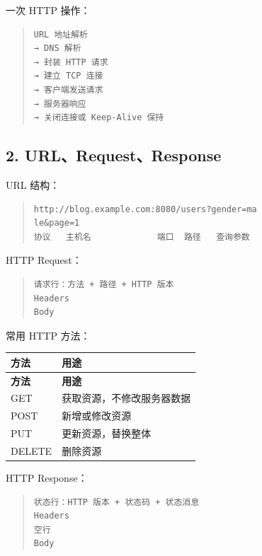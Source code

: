 \documentclass[UTF8,zihao=-4]{ctexart}
\begin{document}
一次 HTTP 操作：

\begin{quote}
\footnotesize
\begin{verbatim}
URL 地址解析
→ DNS 解析
→ 封装 HTTP 请求
→ 建立 TCP 连接
→ 客户端发送请求
→ 服务器响应
→ 关闭连接或 Keep-Alive 保持
\end{verbatim}
\end{quote}

\subsection{2. URL、Request、Response}

URL 结构：

\begin{quote}
\footnotesize
\begin{verbatim}
http://blog.example.com:8080/users?gender=ma
le&page=1
协议   主机名             端口  路径   查询参数
\end{verbatim}
\end{quote}

HTTP Request：

\begin{quote}
\footnotesize
\begin{verbatim}
请求行：方法 + 路径 + HTTP 版本
Headers
Body
\end{verbatim}
\end{quote}

常用 HTTP 方法：

{
\footnotesize
\begin{longtable}{|>{\raggedright\arraybackslash}p{}|>{\raggedright\arraybackslash}p{}|}
\hline
\textbf{方法} & \textbf{用途} \\
\hline
\endfirsthead
\hline
\textbf{方法} & \textbf{用途} \\
\hline
\endhead
GET & 获取资源，不修改服务器数据 \\
\hline
POST & 新增或修改资源 \\
\hline
PUT & 更新资源，替换整体 \\
\hline
DELETE & 删除资源 \\
\hline
\end{longtable}
}


HTTP Response：

\begin{quote}
\footnotesize
\begin{verbatim}
状态行：HTTP 版本 + 状态码 + 状态消息
Headers
空行
Body
\end{verbatim}
\end{quote}
\end{document}
